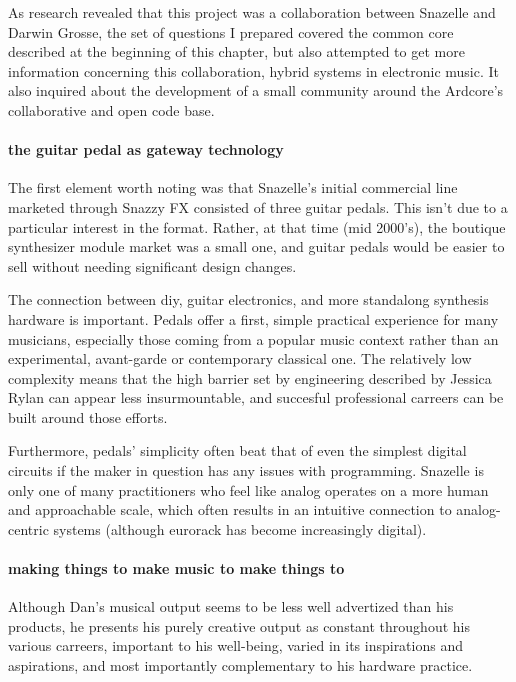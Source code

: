 As research revealed that this project was a collaboration between Snazelle and Darwin Grosse, the set of questions I prepared covered the common core described at the beginning of this chapter, but also attempted to get more information concerning this collaboration, hybrid systems in electronic music. It also inquired about the development of a small community around the Ardcore's collaborative and open code base. 

\paragraph{the guitar pedal as gateway technology}

The first element worth noting was that Snazelle's initial commercial line marketed through Snazzy FX consisted of three guitar pedals. This isn't due to a particular interest in the format. Rather, at that time (mid 2000's), the boutique synthesizer module market was a small one, and guitar pedals would be easier to sell without needing significant design changes. 

The connection between diy, guitar electronics, and more standalong synthesis hardware is important. Pedals offer a first, simple practical experience for many musicians, especially those coming from a popular music context rather than an experimental, avant-garde or contemporary classical one. The relatively low complexity means that the high barrier set by engineering described by Jessica Rylan can appear less insurmountable, and succesful professional carreers can be built around those efforts. 

Furthermore, pedals' simplicity often beat that of even the simplest digital circuits if the maker in question has any issues with programming. Snazelle is only one of many practitioners who feel like analog operates on a more human and approachable scale, which often results in an intuitive connection to analog-centric systems (although eurorack has become increasingly digital). 

\paragraph{making things to make music to make things to}

Although Dan's musical output seems to be less well advertized than his products, he presents his purely creative output as constant throughout his various carreers, important to his well-being, varied in its inspirations and aspirations, and most importantly complementary to his hardware practice. 

